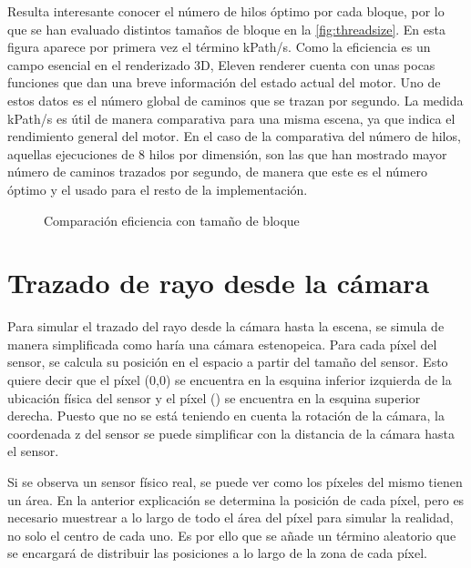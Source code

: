 Resulta interesante conocer el número de hilos óptimo por cada bloque, por lo que se han evaluado distintos tamaños de bloque en la \autoref{fig:threadsize}. En esta figura aparece por primera vez el término kPath/s. Como la eficiencia es un campo esencial en el renderizado 3D, Eleven renderer cuenta con unas pocas funciones que dan una breve información del estado actual del motor. Uno de estos datos es el número global de caminos que se trazan por segundo. La medida kPath/s es útil de manera comparativa para una misma escena, ya que indica el rendimiento general del motor. En el caso de la comparativa del número de hilos, aquellas ejecuciones de 8 hilos por dimensión, son las que han mostrado mayor número de caminos trazados por segundo, de manera que este es el número óptimo y el usado para el resto de la implementación.

\begin{figure}[H]
\centering
{}
\caption{Comparación eficiencia con tamaño de bloque}
\label{fig:threadsize}
\end{figure}


\section{Trazado de rayo desde la cámara}
\label{sec:calculatecameraray}

Para simular el trazado del rayo desde la cámara hasta la escena, se simula de manera simplificada como haría una cámara estenopeica. Para cada píxel del sensor, se calcula su posición en el espacio a partir del tamaño del sensor. Esto quiere decir que el píxel (0,0) se encuentra en la esquina inferior izquierda de la ubicación física del sensor y el píxel () se encuentra en la esquina superior derecha. Puesto que no se está teniendo en cuenta la rotación de la cámara, la coordenada z del sensor se puede simplificar con la distancia de la cámara hasta el sensor.

Si se observa un sensor físico real, se puede ver como los píxeles del mismo tienen un área. En la anterior explicación se determina la posición de cada píxel, pero es necesario muestrear a lo largo de todo el área del píxel para simular la realidad, no solo el centro de cada uno. Es por ello que se añade un término aleatorio  que se encargará de distribuir las posiciones a lo largo de la zona de cada píxel.

